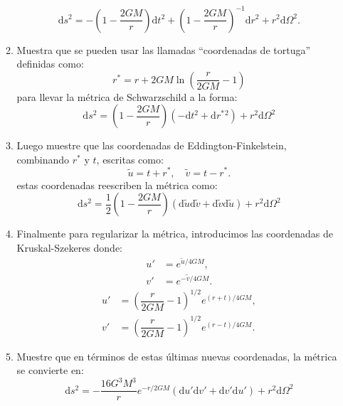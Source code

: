 \documentclass[../main]{subfiles}
\begin{document}
\begin{enumerate}
\begin{enumerate}[label=(\alph*)]
        \begin{equation}
            \mathrm{d}s^2=-\left(1-\dfrac{2GM}{r}\right)\mathrm{d}t^2+\left(1-\dfrac{2GM}{r}\right)^{-1}\mathrm{d}r^2+r^2\mathrm{d}\Omega^2.
        \end{equation}
        \item Muestra que se pueden usar las llamadas ``coordenadas de tortuga'' definidas como:
        \begin{equation}
            r^*=r+2GM\ln\left(\dfrac{r}{2GM}-1\right)
        \end{equation}
        para llevar la métrica de Schwarzschild a la forma:
        \begin{equation}
            \mathrm{d}s^2=\left(1-\dfrac{2GM}{r}\right)(-\mathrm{d}t^2+\mathrm{d}r^*{}^2)+r^2\mathrm{d}\Omega^2
        \end{equation}
        \item Luego muestre que las coordenadas de Eddington-Finkelstein, combinando $r^*$ y $t$, escritas como:
        \begin{equation}
            \tilde{u}=t+r^*, \quad \tilde{v}=t-r^*.
        \end{equation}
        estas coordenadas reescriben la métrica como:
        \begin{equation}
            \mathrm{d}s^2=\dfrac{1}{2}\left(1-\dfrac{2GM}{r}\right)(\mathrm{d}\tilde{u}\mathrm{d}\tilde{v}+\mathrm{d}\tilde{v}\mathrm{d}\tilde{u})+r^2\mathrm{d}\Omega^2
        \end{equation}
        \item Finalmente para regularizar la métrica, introducimos las coordenadas de Kruskal-Szekeres donde:
        \begin{align}
            u'&=e^{\tilde{u}/4GM},\\
            v'&=e^{-\tilde{v}/4GM}.
        \end{align}
        \vspace{-0.7cm}
        \begin{align}
            u'&=\left(\dfrac{r}{2GM}-1\right)^{1/2}e^{(r+t)/4GM},\\
            v'&=\left(\dfrac{r}{2GM}-1\right)^{1/2}e^{(r-t)/4GM}.
        \end{align}
        \item Muestre que en términos de estas últimas nuevas coordenadas, la métrica se convierte en:
        \begin{equation}
            \mathrm{d}s^2=-\dfrac{16G^3 M^3}{r}e^{-r/2GM}(\mathrm{d}u'\mathrm{d}v'+\mathrm{d}v'\mathrm{d}u')+r^2\mathrm{d}\Omega^2

\end{equation}
\end{enumerate}
\end{enumerate}
\end{document}
